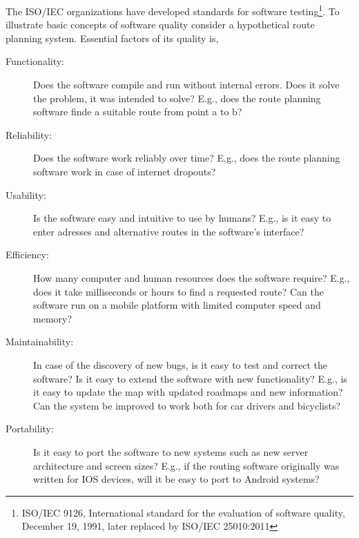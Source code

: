 The ISO/IEC organizations have developed standards for software testing\footnote{ISO/IEC 9126, International standard for the evaluation of software quality, December 19, 1991, later replaced by ISO/IEC 25010:2011}.  To illustrate basic concepts of software quality consider a hypothetical route planning system. Essential factors of its quality is,
\begin{description}
\item[Functionality:] Does the software compile and run without internal errors. Does it solve the problem, it was intended to solve? E.g., does the route planning software finde a suitable route from point a to b?
\item[Reliability:] Does the software work reliably over time? E.g., does the route planning software work in case of internet dropouts?
\item[Usability:] Is the software easy and intuitive to use by humans? E.g., is it easy to enter adresses and alternative routes in the software's interface?
\item[Efficiency:] How many computer and human resources does the software require? E.g., does it take milliseconds or hours to find a requested route? Can the software run on a mobile platform with limited computer speed and memory?
\item[Maintainability:] In case of the discovery of new bugs, is it easy to test and correct the software? Is it easy to extend the software with new functionality? E.g., is it easy to update the map with updated roadmaps and new information? Can the system be improved to work both for car drivers and bicyclists? 
\item[Portability:] Is it easy to port the software to new systems such as new server architecture and screen sizes? E.g., if the routing software originally was written for IOS devices, will it be easy to port to Android systems?
\end{description}
